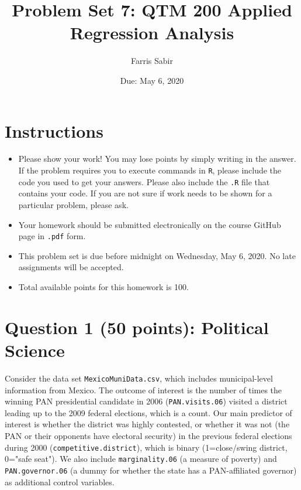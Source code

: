 \documentclass[12pt,letterpaper]{article}
\title{Problem Set 7: QTM 200 Applied Regression Analysis}
\date{Due: May 6, 2020}
\author{Farris Sabir}
\begin{document}
	\maketitle
	
	\section*{Instructions}
	\begin{itemize}
		\item Please show your work! You may lose points by simply writing in the answer. If the problem requires you to execute commands in \texttt{R}, please include the code you used to get your answers. Please also include the \texttt{.R} file that contains your code. If you are not sure if work needs to be shown for a particular problem, please ask.
		\item Your homework should be submitted electronically on the course GitHub page in \texttt{.pdf} form.
		\item This problem set is due before midnight on Wednesday, May 6, 2020. No late assignments will be accepted.
		\item Total available points for this homework is 100.
	\end{itemize}
	
	\vspace{.5cm}

\section*{Question 1 (50 points): Political Science}	
\noindent Consider the data set \texttt{MexicoMuniData.csv}, which includes municipal-level information from Mexico. The outcome of interest is the number of times the winning PAN presidential candidate in 2006 (\texttt{PAN.visits.06}) visited a district leading up to the 2009 federal elections, which is a count. Our main predictor of interest is whether the district was highly contested, or whether it was not (the PAN or their opponents have electoral security) in the previous federal elections during 2000 (\texttt{competitive.district}), which is binary (1=close/swing district, 0="safe seat"). We also include \texttt{marginality.06} (a measure of poverty) and \texttt{PAN.governor.06} (a dummy for whether the state has a PAN-affiliated governor) as additional control variables. 

  
\end{document}

